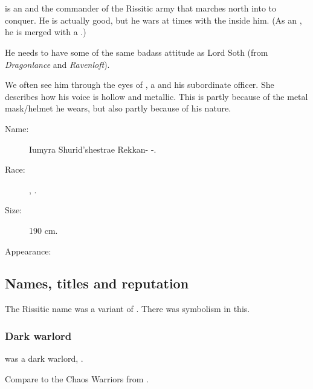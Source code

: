 \section{\Narkiza}
\index{\Narkiza}
\Narkiza{} is an \Ashenoch{} and the commander of the Rissitic army that marches north into \Velcad{} to conquer. 
He is actually good, but he wars at times with the \shadowcreature{} inside him. 
(As an \Ashenoch, he is merged with a \shadowcreature.)

He needs to have some of the same badass attitude as Lord Soth (from \emph{Dragonlance} and \emph{Ravenloft}). 

We often see him through the eyes of \Kufur, a \sphyle{} and his subordinate officer. 
She describes how his voice is hollow and metallic. 
This is partly because of the metal mask/helmet he wears, but also partly because of his \mdaemonic{} \Ashenoch{} nature. 

\begin{description}
  \item[Name:] \Narkiza{} Iumyra Shurid'shestrae Rekkan-\Neftzaid{} \Ashenoch-\Hashkfed.
  \item[Race:] \Scatha, \Ashenoch{}. 
  \item[Size:] 190 cm. 
  \item[Appearance:] 
\end{description}









\subsection{Names, titles and reputation}
The Rissitic name \quo{{\Narkiza}} was a variant of . 
There was symbolism in this. 





\subsubsection{Dark warlord}
\Narkiza was a dark warlord, . 

Compare to the Chaos Warriors from \cite{RPG:Warhammer}. 









